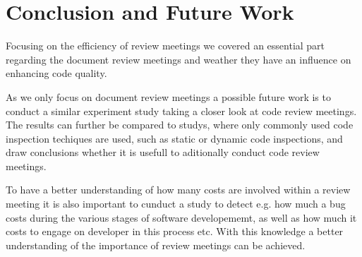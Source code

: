 \section{Conclusion and Future Work}

Focusing on the efficiency of review meetings we covered an essential part regarding the document review meetings and weather they have an influence on enhancing code quality.  

As we only focus on document review meetings a possible future work is to conduct a similar experiment study taking a closer look at code review meetings. The results can further be compared to studys, where only commonly used code inspection techiques are used, such as static or dynamic code inspections, and draw conclusions whether it is usefull to aditionally conduct code review meetings.   

To have a better understanding of how many costs are involved within a review meeting it is also important to cunduct a study to detect e.g. how much a bug costs during the various stages of software developememt, as well as how much it costs to engage on developer in this process etc. With this knowledge a better understanding of the importance of review meetings can be achieved.